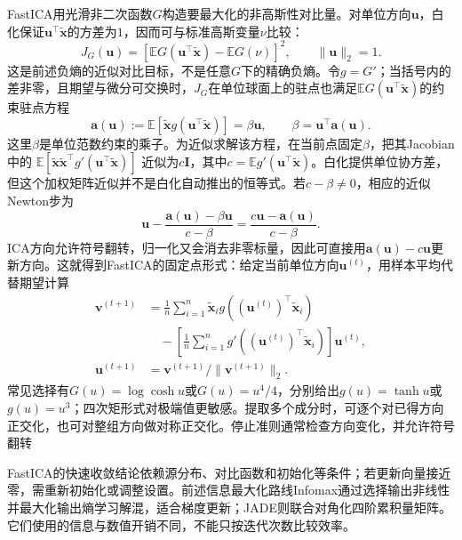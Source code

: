 FastICA用光滑非二次函数$G$构造要最大化的非高斯性对比量。对单位方向$\bm{u}$，白化保证$\bm{u}^{\top}\widetilde{\bm{x}}$的方差为$1$，因而可与标准高斯变量$\nu$比较：
\begin{equation}
  J_G(\bm{u})
  =\left[
    \mathbb{E}G(\bm{u}^{\top}\widetilde{\bm{x}})
    -\mathbb{E}G(\nu)
  \right]^2,
  \qquad \lVert\bm{u}\rVert_2=1.
  \label{eq:dim-fastica-contrast}
\end{equation}
这是前述负熵的近似对比目标，不是任意$G$下的精确负熵。令$g=G'$；当括号内的差非零，且期望与微分可交换时，$J_G$在单位球面上的驻点也满足$\mathbb{E}G(\bm{u}^{\top}\widetilde{\bm{x}})$的约束驻点方程
\[
  \bm{a}(\bm{u})
  :=\mathbb{E}\!\left[\widetilde{\bm{x}}
       g(\bm{u}^{\top}\widetilde{\bm{x}})\right]
  =\beta\bm{u},
  \qquad
  \beta=\bm{u}^{\top}\bm{a}(\bm{u}).
\]
这里$\beta$是单位范数约束的乘子。为近似求解该方程，在当前点固定$\beta$，把其Jacobian中的
$\mathbb{E}[\widetilde{\bm{x}}\widetilde{\bm{x}}^{\top}
g'(\bm{u}^{\top}\widetilde{\bm{x}})]$
近似为$c\bm{I}$，其中$c=\mathbb{E}g'(\bm{u}^{\top}\widetilde{\bm{x}})$。白化提供单位协方差，但这个加权矩阵近似并不是白化自动推出的恒等式。若$c-\beta\ne0$，相应的近似Newton步为
\[
  \bm{u}-\frac{\bm{a}(\bm{u})-\beta\bm{u}}{c-\beta}
  =\frac{c\bm{u}-\bm{a}(\bm{u})}{c-\beta}.
\]
ICA方向允许符号翻转，归一化又会消去非零标量，因此可直接用$\bm{a}(\bm{u})-c\bm{u}$更新方向。这就得到FastICA的固定点形式：给定当前单位方向$\bm{u}^{(t)}$，用样本平均代替期望计算
\begin{equation}
  \begin{aligned}
  \bm{v}^{(t+1)}
    &=\frac1n\sum_{i=1}^{n}
      \widetilde{\bm{x}}_i
           g((\bm{u}^{(t)})^{\top}\widetilde{\bm{x}}_i)\\
    &\quad-\left[\frac1n\sum_{i=1}^{n}
      g'((\bm{u}^{(t)})^{\top}\widetilde{\bm{x}}_i)\right]\bm{u}^{(t)},\\
  \bm{u}^{(t+1)}
    &=\bm{v}^{(t+1)}/\lVert\bm{v}^{(t+1)}\rVert_2.
  \end{aligned}
  \label{eq:dim-fastica}
\end{equation}
常见选择有$G(u)=\log\cosh u$或$G(u)=u^4/4$，分别给出$g(u)=\tanh u$或$g(u)=u^3$；四次矩形式对极端值更敏感。提取多个成分时，可逐个对已得方向正交化，也可对整组方向做对称正交化。停止准则通常检查方向变化，并允许符号翻转

FastICA的快速收敛结论依赖源分布、对比函数和初始化等条件；若更新向量接近零，需重新初始化或调整设置。前述信息最大化路线Infomax通过选择输出非线性并最大化输出熵学习解混，适合梯度更新；JADE则联合对角化四阶累积量矩阵。它们使用的信息与数值开销不同，不能只按迭代次数比较效率。

